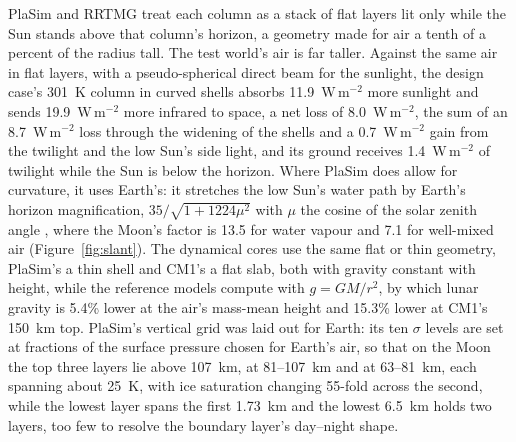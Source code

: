 PlaSim and RRTMG treat each column as a stack of flat layers lit only while the Sun stands above that column's
horizon, a geometry made for air a tenth of a percent of the radius tall. The test world's air is far taller.
Against the same air in flat layers, with a pseudo-spherical direct beam for the sunlight, the design case's
301~K column in curved shells absorbs 11.9~W\,m$^{-2}$ more sunlight and sends 19.9~W\,m$^{-2}$ more infrared to
space, a net loss of 8.0~W\,m$^{-2}$, the sum of an 8.7~W\,m$^{-2}$ loss through the widening of the shells and a
0.7~W\,m$^{-2}$ gain from the twilight and the low Sun's side light, and its ground receives 1.4~W\,m$^{-2}$ of
twilight while the Sun is below the horizon. Where PlaSim does allow for curvature, it uses Earth's: it stretches the low Sun's water path
by Earth's horizon magnification,
$35/\sqrt{1+1224\mu^2}$ with $\mu$ the cosine of the solar zenith angle
\autocite{lacis1974parameterization,rodgers1967use}, where the Moon's factor is 13.5 for water vapour and 7.1
for well-mixed air (Figure~\ref{fig:slant}). The dynamical cores use the same flat or thin geometry,
PlaSim's a thin shell and CM1's a flat slab, both with gravity constant with height, while the reference models
compute with $g = GM/r^2$, by which lunar gravity is 5.4\% lower at the air's mass-mean height and 15.3\% lower
at CM1's 150~km top. PlaSim's vertical grid was laid out for Earth: its ten $\sigma$ levels are set at
fractions of the surface pressure chosen for Earth's air, so that on the Moon the top three layers lie above 107~km, at 81--107~km and at 63--81~km, each spanning about 25~K, with ice saturation changing 55-fold across the second, while the lowest layer spans the first 1.73~km and the lowest 6.5~km holds two layers, too few to resolve the boundary layer's day--night shape.


